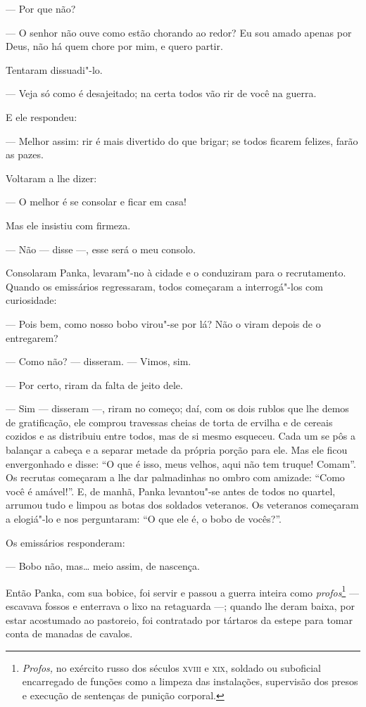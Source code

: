 --- Por que não?

--- O senhor não ouve como estão chorando ao redor? Eu sou amado apenas
por Deus, não há quem chore por mim, e quero partir.

Tentaram dissuadi"-lo.

--- Veja só como é desajeitado; na certa todos vão rir de você na
guerra.

E ele respondeu:

--- Melhor assim: rir é mais divertido do que brigar; se todos ficarem
felizes, farão as pazes.

Voltaram a lhe dizer:

--- O melhor é se consolar e ficar em casa!

Mas ele insistiu com firmeza.

--- Não --- disse ---, esse será o meu consolo.

Consolaram Panka, levaram"-no à cidade e o conduziram para o
recrutamento. Quando os emissários regressaram, todos começaram a
interrogá"-los com curiosidade:

--- Pois bem, como nosso bobo virou"-se por lá? Não o viram depois de o
entregarem?

--- Como não? --- disseram. --- Vimos, sim.

--- Por certo, riram da falta de jeito dele.

--- Sim --- disseram ---, riram no começo; daí, com os dois rublos que
lhe demos de gratificação, ele comprou travessas cheias de torta de
ervilha e de cereais cozidos e as distribuiu entre todos, mas de si
mesmo esqueceu. Cada um se pôs a balançar a cabeça e a separar metade da própria porção para ele. Mas ele ficou envergonhado e disse: ``O que é isso,
meus velhos, aqui não tem truque! Comam''. Os recrutas começaram a lhe
dar palmadinhas no ombro com amizade: ``Como você é amável!''. E, de
manhã, Panka levantou"-se antes de todos no quartel, arrumou tudo e
limpou as botas dos soldados veteranos. Os veteranos começaram a
elogiá"-lo e nos perguntaram: ``O que ele é, o bobo de vocês?''.

Os emissários responderam:

--- Bobo não, mas\ldots{} meio assim, de nascença.

Então Panka, com sua bobice, foi servir e passou a guerra inteira como
\emph{profos}\footnote{\emph{Profos,} no exército russo dos séculos
  \textsc{xviii} e \textsc{xix}, soldado ou suboficial encarregado de funções como a
  limpeza das instalações, supervisão dos presos e execução de sentenças
  de punição corporal.} --- escavava fossos e enterrava o lixo na
retaguarda ---; quando lhe deram baixa, por estar acostumado ao
pastoreio, foi contratado por tártaros da estepe para tomar conta de
manadas de cavalos.

